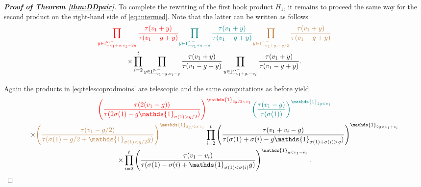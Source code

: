\documentclass[11pt,letterpaper]{amsart}
\def\cch{\mathcal H}
\DeclareMathOperator{\I}{I}
\numberwithin{equation}{section}
\numberwithin{df}{section}
\begin{document}
\begin{proof}[\textbf{Proof of Theorem \ref{thm:DDpair}}]
To complete the rewriting of the first hook product $H_1$, it remains to proceed the same way for the second product on the right-hand side of \eqref{eq:intermed}. Note that the latter can be written as follows
\begin{multline}\label{eq:telescoprodmoins}
\textcolor{red}{\prod_{y \in\I_{-v_1+g,v_1-2g}^{g,-}}\frac{\tau(v_1+y)}{\tau(v_1-g+y)}}\textcolor{teal}{\prod_{y \in\I_{-v_1+g,-g}^{g,-}}\frac{\tau(v_1+y)}{\tau(v_1-g+y)}}\textcolor{brown}{\prod_{y \in\I_{-v_1+g,-g/2}^{g,-}}\frac{\tau(v_1+y)}{\tau(v_1-g+y)}}\\
\times\prod_{i=2}^{t}\prod_{y \in\I_{-v_1+g,v_i-g}^{g,-}}\frac{\tau(v_1+y)}{\tau(v_1-g+y)}\prod_{y \in\I_{-v_1+g,-v_i}^{g,-}}\frac{\tau(v_1+y)}{\tau(v_1-g+y)}.
\end{multline}

Again the products in \eqref{eq:telescoprodmoins} are telescopic and the same computations as before yield
\begin{multline}\label{eq:last_avant_moins}
\textcolor{red}{\left(\frac{\tau(2(v_1-g))}{\tau(2\sigma(1)-g\mathds{1}_{\sigma(1)>g/2})}\right)^{\mathds{1}_{3g/2<v_1}}}\textcolor{teal}{\left(\frac{\tau(v_1-g)}{\tau(\sigma(1))}\right)^{\mathds{1}_{2g<v_1}}}\\
\times\textcolor{brown}{\left(\frac{\tau(v_1-g/2)}{\tau(\sigma(1)-g/2+\mathds{1}_{\sigma(1)<g/2}g)}\right)^{\mathds{1}_{3g/2<v_1}}}
\prod_{i=2}^{t}\left(\frac{\tau(v_1+v_i-g)}{\tau(\sigma(1)+\sigma(i)-g\mathds{1}_{\sigma(1)+\sigma(i)>g})}\right)^{\mathds{1}_{2g<v_1+v_i}}\\
\times\prod_{i=2}^{t}\left(\frac{\tau(v_1-v_i)}{\tau(\sigma(1)-\sigma(i)+\mathds{1}_{\sigma(1)<\sigma(i)}g)}\right)^{\mathds{1}_{g<v_1-v_i}}.
\end{multline}


\end{proof}
\end{document}
